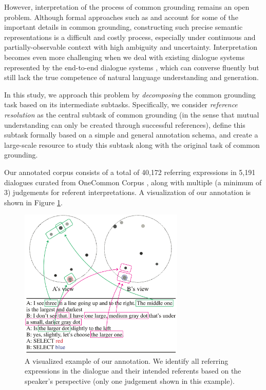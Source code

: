 However, interpretation of the process of common grounding remains an open problem. Although formal approaches such as \citet{lascarides2009agreement} and \citet{poesio2010completions} account for some of the important details in common grounding, constructing such precise semantic representations is a difficult and costly process, especially under continuous and partially-observable context with high ambiguity and uncertainty. Interpretation becomes even more challenging when we deal with existing dialogue systems represented by the end-to-end dialogue systems \citep{vinyals2015neural,bordes2017learning}, which can converse fluently but still lack the true competence of natural language understanding and generation.

In this study, we approach this problem by \textit{decomposing} the common grounding task based on its intermediate subtasks. Specifically, we consider \textit{reference resolution} as the central subtask of common grounding (in the sense that mutual understanding can only be created through successful references), define this subtask formally based on a simple and general annotation schema, and create a large-scale resource to study this subtask along with the original task of common grounding.

Our annotated corpus consists of a total of 40,172 referring expressions in 5,191 dialogues curated from OneCommon Corpus \citep{udagawa2019natural}, along with multiple (a minimum of 3) judgements for referent interpretations. A visualization of our annotation is shown in Figure \ref{04_fig:first_example}.

\begin{figure}[th!]
\centering
\includegraphics[width=0.7\textwidth]{annotated_dialogue.pdf}
\caption{A visualized example of our annotation. We identify all referring expressions in the dialogue and their intended referents based on the speaker's perspective (only one judgement shown in this example).
}
\label{04_fig:first_example}
\end{figure}

